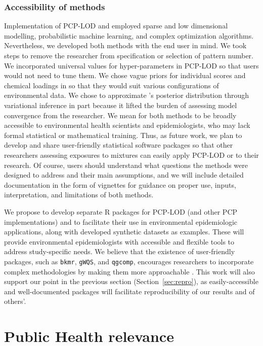 \subsubsection{Accessibility of methods}\label{diss:access}
Implementation of PCP-LOD and \bnmf employed sparse and low dimensional modelling, probabilistic machine learning, and complex optimization algorithms. Nevertheless, we developed both methods with the end user in mind. We took steps to remove the researcher from specification or selection of pattern number. We incorporated universal values for hyper-parameters in PCP-LOD so that users would not need to tune them. We chose vague priors for individual scores and chemical loadings in \bnmf so that they would suit various configurations of environmental data. We chose to approximate \bnmfc's posterior distribution through variational inference in part because it lifted the burden of assessing model convergence from the researcher. We mean for both methods to be broadly accessible to environmental health scientists and epidemiologists, who may lack formal statistical or mathematical training. Thus, as future work, we plan to develop and share user-friendly statistical software packages so that other researchers assessing exposures to mixtures can easily apply PCP-LOD or \bnmf to their research. Of course, users should understand what questions the methods were designed to address and their main assumptions, and we will include detailed documentation in the form of vignettes for guidance on proper use, inputs, interpretation, and limitations of both methods.

We propose to develop separate R packages for PCP-LOD (and other PCP implementations) and \bnmf to facilitate their use in environmental epidemiologic applications, along with developed synthetic datasets as examples. These will provide environmental epidemiologists with accessible and flexible tools to address study-specific needs. We believe that the existence of user-friendly packages, such as \texttt{bkmr}, \texttt{gWQS}, and \texttt{qgcomp}, encourages researchers to incorporate complex methodologies by making them more approachable \citep{bobb2018statistical, renzetti2016gwqs, keil2020quantile}. This work will also support our point in the previous section (Section~\ref{sec:repro}), as easily-accessible and well-documented packages will facilitate reproducibility of our results and of others'.

\section{Public Health relevance}\label{sec:ph}
